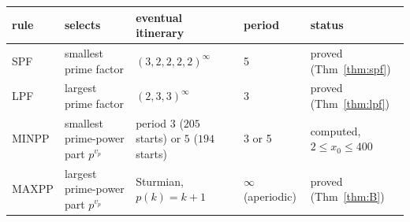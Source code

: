 \begin{tabular}{@{}llllp{}@{}}\toprule
rule & selects & eventual itinerary & period & status\\\midrule
SPF & smallest prime factor & $(3,2,2,2,2)^\infty$ & 5 & proved (Thm~\ref{thm:spf}) \\
LPF & largest prime factor & $(2,3,3)^\infty$ & 3 & proved (Thm~\ref{thm:lpf}) \\
MINPP & smallest prime-power part $p^{v_p}$ & period $3$ ($205$ starts) or $5$ ($194$ starts) & 3 or 5 & computed, $2\le x_0\le400$ \\
MAXPP & largest prime-power part $p^{v_p}$ & Sturmian, $p(k)=k+1$ & $\infty$ (aperiodic) & proved (Thm~\ref{thm:B}) \\
\bottomrule\end{tabular}
